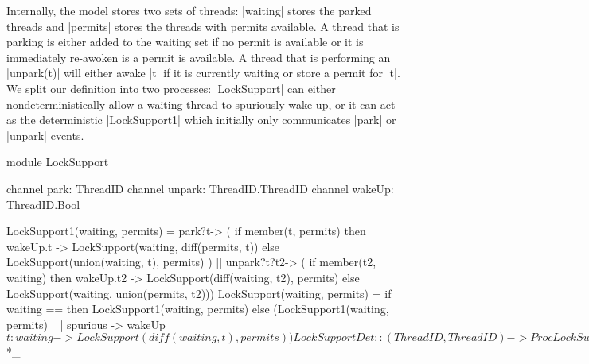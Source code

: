 Internally, the model stores two sets of threads: |waiting| stores the parked threads and |permits| stores the threads with permits available. A thread that is parking is either added to the waiting set if no permit is available or it is immediately re-awoken is a permit is available. A thread that is performing an |unpark(t)| will either awake |t| if it is currently waiting or store a permit for |t|. We split our definition into two processes: |LockSupport| can either nondeterministically allow a waiting thread to spuriously wake-up, or it can act as the deterministic |LockSupport1| which initially only communicates |park| or |unpark| events.

\begin{cspm}[caption={The CSP model of the Java LockSupport module}]
module LockSupport

  channel park: ThreadID
  channel unpark: ThreadID.ThreadID
  channel wakeUp: ThreadID.Bool

  LockSupport1(waiting, permits) =
    park?t-> (
      if member(t, permits)
        then wakeUp.t -> LockSupport(waiting, diff(permits, {t}))
      else LockSupport(union(waiting, {t}), permits) )
    []
    unpark?t?t2-> ( 
      if member(t2, waiting)
        then wakeUp.t2 -> LockSupport(diff(waiting, {t2}), permits)
      else LockSupport(waiting, union(permits, {t2})))
  LockSupport(waiting, permits) =
    if waiting == {} then LockSupport1(waiting, permits)
    else (LockSupport1(waiting, permits)
          |~| spurious -> wakeUp$t:waiting -> LockSupport(diff(waiting, {t}), permits))
    

  LockSupportDet :: ({ThreadID}, {ThreadID}) -> Proc
  LockSupportDet(waiting, permits) = LockSupportDet1(waiting, permits)
  LockSupportDet1(waiting, permits) = ... -- Analogous to LockSupport1

exports

  channel spurious

  InitLockSupport = LockSupport({}, {})

  InitLockSupportDet = LockSupportDet({}, {})

  Park(t) = park.t -> wakeUp.t?_ ->  SKIP

  Unpark(t, t') = unpark.t.t' -> SKIP


endmodule _*$*_
\end{cspm}

